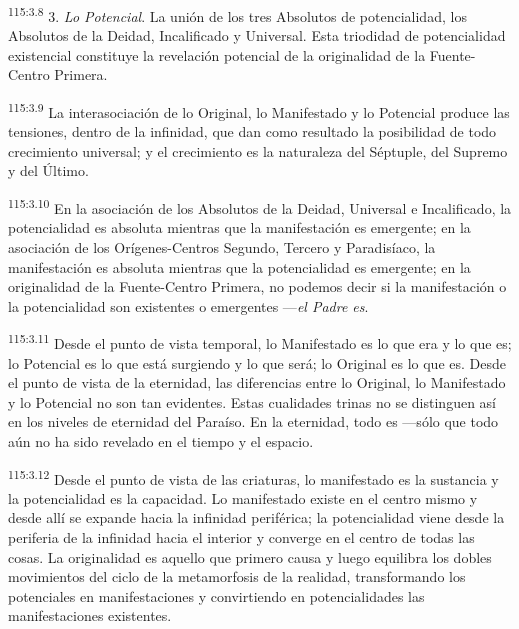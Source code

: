 \par
\textsuperscript{115:3.8} 3. \textit{Lo Potencial}. La unión de los tres Absolutos de potencialidad, los Absolutos de la Deidad, Incalificado y Universal. Esta triodidad de potencialidad existencial constituye la revelación potencial de la originalidad de la Fuente-Centro Primera.

\par
\textsuperscript{115:3.9} La interasociación de lo Original, lo Manifestado y lo Potencial produce las tensiones, dentro de la infinidad, que dan como resultado la posibilidad de todo crecimiento universal; y el crecimiento es la naturaleza del Séptuple, del Supremo y del Último.

\par
\textsuperscript{115:3.10} En la asociación de los Absolutos de la Deidad, Universal e Incalificado, la potencialidad es absoluta mientras que la manifestación es emergente; en la asociación de los Orígenes-Centros Segundo, Tercero y Paradisíaco, la manifestación es absoluta mientras que la potencialidad es emergente; en la originalidad de la Fuente-Centro Primera, no podemos decir si la manifestación o la potencialidad son existentes o emergentes ---\textit{el Padre es}.

\par
\textsuperscript{115:3.11} Desde el punto de vista temporal, lo Manifestado es lo que era y lo que es; lo Potencial es lo que está surgiendo y lo que será; lo Original es lo que es. Desde el punto de vista de la eternidad, las diferencias entre lo Original, lo Manifestado y lo Potencial no son tan evidentes. Estas cualidades trinas no se distinguen así en los niveles de eternidad del Paraíso. En la eternidad, todo es ---sólo que todo aún no ha sido revelado en el tiempo y el espacio.

\par
\textsuperscript{115:3.12} Desde el punto de vista de las criaturas, lo manifestado es la sustancia y la potencialidad es la capacidad. Lo manifestado existe en el centro mismo y desde allí se expande hacia la infinidad periférica; la potencialidad viene desde la periferia de la infinidad hacia el interior y converge en el centro de todas las cosas. La originalidad es aquello que primero causa y luego equilibra los dobles movimientos del ciclo de la metamorfosis de la realidad, transformando los potenciales en manifestaciones y convirtiendo en potencialidades las manifestaciones existentes.


